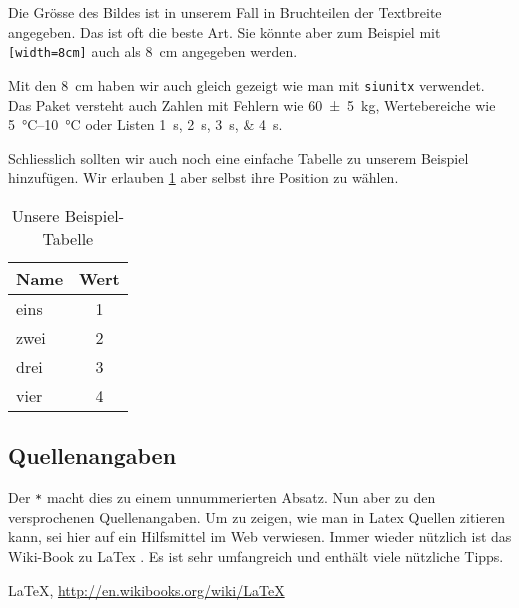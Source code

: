 \documentclass[10pt]{article}
\begin{document}
Die Grösse des Bildes ist in unserem Fall in Bruchteilen der 
  Textbreite angegeben. 
Das ist oft die beste Art.
Sie könnte aber zum Beispiel mit \texttt{[width=8cm]} auch als
  \SI{8}{\centi\meter} angegeben werden.

Mit den \SI{8}{cm} haben wir auch gleich gezeigt wie man mit \texttt{siunitx} 
  verwendet. 
Das Paket versteht auch Zahlen mit Fehlern wie \SI{60 \pm 5}{kg}, 
Wertebereiche wie \SIrange{5}{10}{\degreeCelsius} oder Listen \SIlist{1;2;3;4}{s}.

Schliesslich sollten wir auch noch eine einfache Tabelle 
  zu unserem Beispiel hinzufügen.
Wir erlauben \cref{tab:beispiel} aber selbst ihre Position zu wählen.
\begin{table}[tph]
\centering
\begin{tabular}{lc}
\toprule
Name & Wert\\
\midrule
eins & 1\\
zwei & 2\\
drei & 3\\
vier & 4\\
\bottomrule
\end{tabular}
\caption{Unsere Beispiel-Tabelle}
\label{tab:beispiel}
\end{table} 

\subsection*{Quellenangaben}
Der \texttt{*} macht dies zu einem unnummerierten Absatz.
Nun aber zu den versprochenen Quellenangaben. 
Um zu zeigen, wie man in Latex Quellen zitieren kann, 
  sei hier auf ein Hilfsmittel im Web verwiesen.
Immer wieder nützlich ist das Wiki-Book zu LaTex \cite{wikibook}.
Es ist sehr umfangreich und enthält viele nützliche Tipps.

\begin{thebibliography}{100}
 LaTeX, \url{http://en.wikibooks.org/wiki/LaTeX}
\end{thebibliography}
\end{document}
